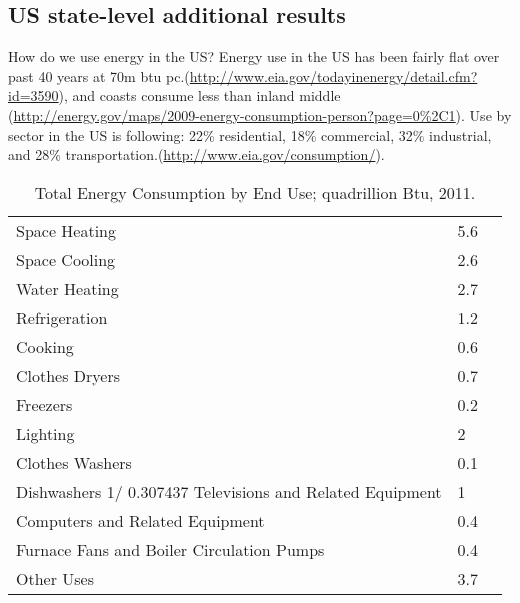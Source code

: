 \documentclass[10pt, letterpaper]{article}
\begin{document}
\begin{spacing}{1.0}
\section{US state-level additional results}
How do we use energy in the US? %
Energy use in the US has been fairly flat over past 40 years at 70m btu
pc.(\url{http://www.eia.gov/todayinenergy/detail.cfm?id=3590}), and coasts consume
less than inland middle
(\url{http://energy.gov/maps/2009-energy-consumption-person?page=0%2C1}). 
Use by sector in the US is following: 22\% residential, 18\% commercial, 32\% industrial, and
28\% transportation.(\url{http://www.eia.gov/consumption/}). 






\begin{table}[H]\centering\footnotesize
\caption{\label{freq_im_god} Total Energy Consumption by End Use; quadrillion
  Btu, 2011.}
\begin{tabular}{lll}   \hline 
Space Heating&	5.6\\
Space Cooling&	2.6\\
Water Heating&	2.7\\
Refrigeration&	1.2\\
Cooking&	0.6\\
Clothes Dryers&	0.7\\
Freezers&	0.2\\
Lighting&	2\\
Clothes Washers&	0.1\\
Dishwashers 1/	0.307437
Televisions and Related Equipment&	1\\
Computers and Related Equipment &	0.4\\
Furnace Fans and Boiler Circulation Pumps&	0.4\\
Other Uses&	3.7\\\hline
\end{tabular}\end{table}


\end{spacing}
\end{document}
